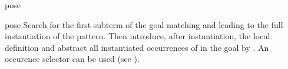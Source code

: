 \begin{tactic}[pose x := $\;\pi$]{pose}
  \begin{tsyntax}[empty]{pose}
  Search for the first subterm of the goal matching  and leading
  to the full instantiation of the pattern. Then introduce, after
  instantiation, the local definition  and abstract
  all instantiated occurrences of  in the goal by . An
  occurence selector can be used (see ).
  \end{tsyntax}
\end{tactic}
